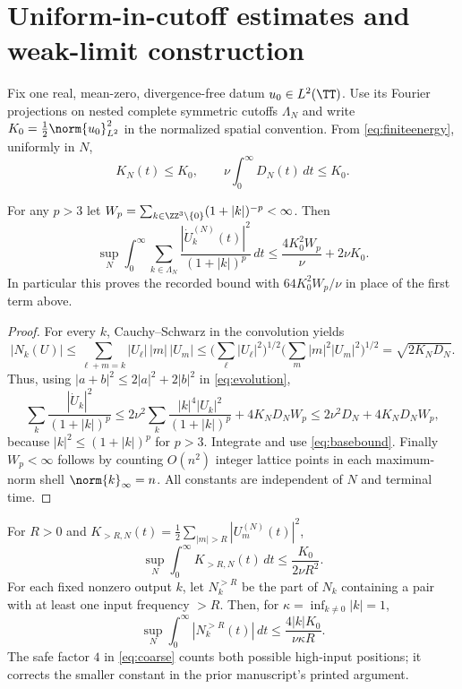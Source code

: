 \section{Uniform-in-cutoff estimates and weak-limit construction}
Fix one real, mean-zero, divergence-free datum $u_0\in L^2(\TT)$. Use its Fourier projections on nested complete symmetric cutoffs $\Lambda_N$ and write $K_0=\tfrac12\norm{u_0}_{L^2}^2$ in the normalized spatial convention. From \eqref{eq:finiteenergy}, uniformly in $N$,
\begin{equation}\label{eq:basebound}
K_N(t)\le K_0,\qquad \nu\int_0^\infty D_N(t)\,dt\le K_0.
\end{equation}
\begin{theorem}\label{thm:weighted}
For any $p>3$ let $W_p=\sum_{k\in\ZZ^3\setminus\{0\}}(1+|k|)^{-p}<\infty$. Then
\begin{equation}\label{eq:weighted}
\boxed{\quad \sup_N\int_0^\infty\sum_{k\in\Lambda_N}
\frac{|\dot U^{(N)}_k(t)|^2}{(1+|k|)^p}\,dt
\le\frac{4K_0^2W_p}{\nu}+2\nu K_0.\quad}
\end{equation}
In particular this proves the recorded bound with $64K_0^2W_p/\nu$ in place of the first term above.
\end{theorem}
\begin{proof}
For every $k$, Cauchy--Schwarz in the convolution yields
\[
|N_k(U)|\le\sum_{\ell+m=k}|U_\ell|\,|m|\,|U_m|
\le\Big(\sum_\ell|U_\ell|^2\Big)^{1/2}
\Big(\sum_m|m|^2|U_m|^2\Big)^{1/2}
=\sqrt{2K_ND_N}.
\]
Thus, using $|a+b|^2\le2|a|^2+2|b|^2$ in \eqref{eq:evolution},
\[
\sum_k\frac{|\dot U_k|^2}{(1+|k|)^p}
\le2\nu^2\sum_k\frac{|k|^4|U_k|^2}{(1+|k|)^p}
+4K_ND_NW_p
\le2\nu^2D_N+4K_ND_NW_p,
\]
because $|k|^2\le(1+|k|)^p$ for $p>3$. Integrate and use \eqref{eq:basebound}. Finally $W_p<\infty$ follows by counting $O(n^2)$ integer lattice points in each maximum-norm shell $\norm{k}_\infty=n$. All constants are independent of $N$ and terminal time.
\end{proof}
\begin{proposition}\label{prop:tail}
For $R>0$ and $K_{>R,N}(t)=\tfrac12\sum_{|m|>R}|U_m^{(N)}(t)|^2$,
\begin{equation}\label{eq:residence}
\sup_N\int_0^\infty K_{>R,N}(t)\,dt\le\frac{K_0}{2\nu R^2}.
\end{equation}
For each fixed nonzero output $k$, let $N_k^{>R}$ be the part of $N_k$ containing a pair with at least one input frequency $>R$. Then, for $\kappa=\inf_{k\ne0}|k|=1$,
\begin{equation}\label{eq:coarse}
\sup_N\int_0^\infty|N_k^{>R}(t)|\,dt
\le\frac{4|k|K_0}{\nu\kappa R}.
\end{equation}
The safe factor $4$ in \eqref{eq:coarse} counts both possible high-input positions; it corrects the smaller constant in the prior manuscript's printed argument.
\end{proposition}
